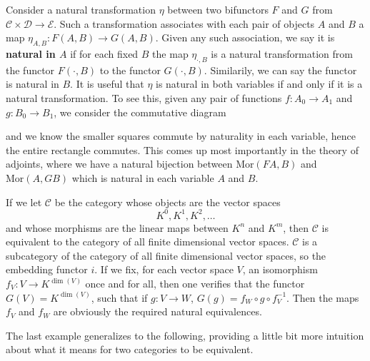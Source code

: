 Consider a natural transformation $\eta$ between two bifunctors $F$ and $G$ from $\mathcal{C} \times \mathcal{D} \to \mathcal{E}$. Such a transformation associates with each pair of objects $A$ and $B$ a map $\eta_{A,B}: F(A,B) \to G(A,B)$. Given any such association, we say it is {\bf natural in $A$} if for each fixed $B$ the map $\eta_{\cdot,B}$ is a natural transformation from the functor $F(\cdot,B)$ to the functor $G(\cdot,B)$. Similarily, we can say the functor is natural in $B$. It is useful that $\eta$ is natural in both variables if and only if it is a natural transformation. To see this, given any pair of functions $f: A_0 \to A_1$ and $g: B_0 \to B_1$, we consider the commutative diagram
%
\begin{center}
\end{center}
%
and we know the smaller squares commute by naturality in each variable, hence the entire rectangle commutes. This comes up most importantly in the theory of adjoints, where we have a natural bijection between $\text{Mor}(FA,B)$ and $\text{Mor}(A,GB)$ which is natural in each variable $A$ and $B$.

\begin{example}
    If we let $\mathcal{C}$ be the category whose objects are the vector spaces
    \[ K^0, K^1, K^2, \dots \]
    and whose morphisms are the linear maps between $K^n$ and $K^m$, then $\mathcal{C}$ is equivalent to the category of all finite dimensional vector spaces. $\mathcal{C}$ is a subcategory of the category of all finite dimensional vector spaces, so the embedding functor $i$. If we fix, for each vector space $V$, an isomorphism $f_V: V \to K^{\dim(V)}$ once and for all, then one verifies that the functor $G(V) = K^{\dim(V)}$, such that if $g: V \to W$, $G(g) = f_W \circ g \circ f_V^{-1}$. Then the maps $f_V$ and $f_W$ are obviously the required natural equivalences.
\end{example}

The last example generalizes to the following, providing a little bit more intuition about what it means for two categories to be equivalent.

